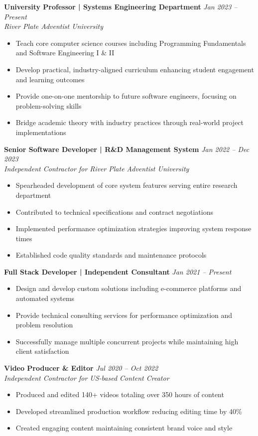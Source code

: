 \documentclass[11pt,a4paper]{article}
\begin{document}
\noindent\textbf{University Professor | Systems Engineering Department} \hfill \textit{Jan 2023 -- Present}\\
\textit{River Plate Adventist University}
\begin{itemize}[leftmargin=*]
\item Teach core computer science courses including Programming Fundamentals and Software Engineering I \& II
\item Develop practical, industry-aligned curriculum enhancing student engagement and learning outcomes
\item Provide one-on-one mentorship to future software engineers, focusing on problem-solving skills
\item Bridge academic theory with industry practices through real-world project implementations
\end{itemize}

\noindent\textbf{Senior Software Developer | R\&D Management System} \hfill \textit{Jan 2022 -- Dec 2023}\\
\textit{Independent Contractor for River Plate Adventist University}
\begin{itemize}[leftmargin=*]
\item Spearheaded development of core system features serving entire research department
\item Contributed to technical specifications and contract negotiations
\item Implemented performance optimization strategies improving system response times
\item Established code quality standards and maintenance protocols
\end{itemize}

\noindent\noindent\textbf{Full Stack Developer | Independent Consultant} \hfill \textit{Jan 2021 -- Present}
\begin{itemize}[leftmargin=*]
\item Design and develop custom solutions including e-commerce platforms and automated systems
\item Provide technical consulting services for performance optimization and problem resolution
\item Successfully manage multiple concurrent projects while maintaining high client satisfaction
\end{itemize}

\noindent\textbf{Video Producer \& Editor} \hfill \textit{Jul 2020 -- Oct 2022}\\
\textit{Independent Contractor for US-based Content Creator}
\begin{itemize}[leftmargin=*]
\item Produced and edited 140+ videos totaling over 350 hours of content
\item Developed streamlined production workflow reducing editing time by 40\%
\item Created engaging content maintaining consistent brand voice and style
\end{itemize}
\end{document}

